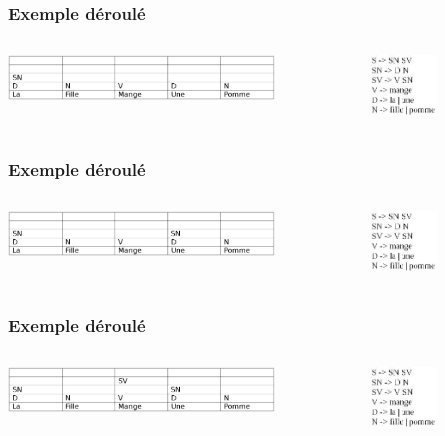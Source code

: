 \documentclass[table]{beamer}
\begin{document}
\begin{frame}
\frametitle{Exemple déroulé}
  \begin{columns}
  \begin{column}{0.6\textwidth}
     \includegraphics[width=200pt,]{7.jpeg}  
  \end{column}
  \begin{column}{0.5\textwidth}
  \includegraphics[width=50pt,]{11.jpeg}  
  \end{column}
  \end{columns}
\end{frame}

\begin{frame}
\frametitle{Exemple déroulé}
  \begin{columns}
  \begin{column}{0.6\textwidth}
     \includegraphics[width=200pt,]{8.jpeg}  
  \end{column}
  \begin{column}{0.5\textwidth}
  \includegraphics[width=50pt,]{11.jpeg}  
  \end{column}
  \end{columns}
\end{frame}

\begin{frame}
\frametitle{Exemple déroulé}
  \begin{columns}
  \begin{column}{0.6\textwidth}
     \includegraphics[width=200pt,]{9.jpeg}  
  \end{column}
  \begin{column}{0.5\textwidth}
  \includegraphics[width=50pt,]{11.jpeg}  
  \end{column}
  \end{columns}
\end{frame}
\end{document}
